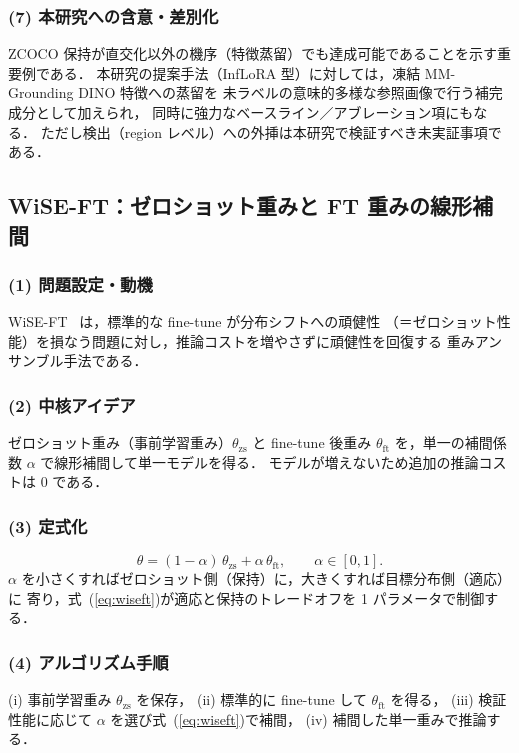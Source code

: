\subsubsection*{(7) 本研究への含意・差別化}
ZCOCO 保持が直交化以外の機序（特徴蒸留）でも達成可能であることを示す重要例である．
本研究の提案手法（InfLoRA 型）に対しては，凍結 MM-Grounding DINO 特徴への蒸留を
未ラベルの意味的多様な参照画像で行う補完成分として加えられ，
同時に強力なベースライン／アブレーション項にもなる．
ただし検出（region レベル）への外挿は本研究で検証すべき未実証事項である．

\subsection{WiSE-FT：ゼロショット重みと FT 重みの線形補間}
\label{sub:wiseft}

\subsubsection*{(1) 問題設定・動機}
WiSE-FT~\cite{wiseft} は，標準的な fine-tune が分布シフトへの頑健性
（＝ゼロショット性能）を損なう問題に対し，推論コストを増やさずに頑健性を回復する
重みアンサンブル手法である．

\subsubsection*{(2) 中核アイデア}
ゼロショット重み（事前学習重み）$\theta_{\mathrm{zs}}$ と fine-tune 後重み
$\theta_{\mathrm{ft}}$ を，単一の補間係数 $\alpha$ で線形補間して単一モデルを得る．
モデルが増えないため追加の推論コストは 0 である．

\subsubsection*{(3) 定式化}
\begin{equation}
\theta = (1-\alpha)\,\theta_{\mathrm{zs}} + \alpha\,\theta_{\mathrm{ft}},
\qquad \alpha \in [0,1].
\label{eq:wiseft}
\end{equation}
$\alpha$ を小さくすればゼロショット側（保持）に，大きくすれば目標分布側（適応）に
寄り，式~(\ref{eq:wiseft})が適応と保持のトレードオフを 1 パラメータで制御する．

\subsubsection*{(4) アルゴリズム手順}
(i) 事前学習重み $\theta_{\mathrm{zs}}$ を保存，
(ii) 標準的に fine-tune して $\theta_{\mathrm{ft}}$ を得る，
(iii) 検証性能に応じて $\alpha$ を選び式~(\ref{eq:wiseft})で補間，
(iv) 補間した単一重みで推論する．

